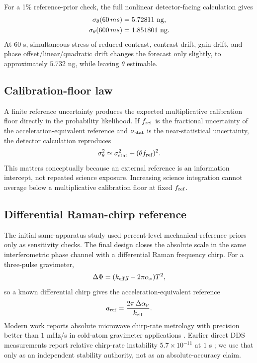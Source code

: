 For a 1\% reference-prior check, the full nonlinear detector-facing calculation gives
\begin{align}
\sigma_\theta(60\,{
m s})&=5.72811\ {\rm ng},\\
\sigma_\theta(600\,{
m s})&=1.851801\ {\rm ng}.
\label{eq:detector-forecast}
\end{align}
At $60$ s, simultaneous stress of reduced contrast, contrast drift, gain drift, and phase offset/linear/quadratic drift changes the forecast only slightly, to approximately $5.732$ ng, while leaving $\theta$ estimable.

\subsection{Calibration-floor law}

A finite reference uncertainty produces the expected multiplicative calibration floor directly in the probability likelihood. If $f_{\rm ref}$ is the fractional uncertainty of the acceleration-equivalent reference and $\sigma_{\rm stat}$ is the near-statistical uncertainty, the detector calculation reproduces
\begin{equation}
\sigma_\theta^2\simeq\sigma_{\rm stat}^2+(\theta f_{\rm ref})^2.
\label{eq:floorlaw}
\end{equation}
This matters conceptually because an external reference is an information intercept, not repeated science exposure. Increasing science integration cannot average below a multiplicative calibration floor at fixed $f_{\rm ref}$.

\subsection{Differential Raman-chirp reference}

The initial same-apparatus study used percent-level mechanical-reference priors only as sensitivity checks. The final design closes the absolute scale in the same interferometric phase channel with a differential Raman frequency chirp. For a three-pulse gravimeter,
\begin{equation}
\Delta\Phi=(k_{\rm eff}g-2\pi\alpha_\nu)T^2,
\label{eq:chirp-phase}
\end{equation}
so a known differential chirp gives the acceleration-equivalent reference
\begin{equation}
a_{\rm ref}=\frac{2\pi\,\Delta\alpha_\nu}{k_{\rm eff}}.
\label{eq:chirp-ref}
\end{equation}
Modern work reports absolute microwave chirp-rate metrology with precision better than $1$ mHz/s in cold-atom gravimeter applications \cite{Zhang2025}. Earlier direct DDS measurements report relative chirp-rate instability $5.7\times10^{-11}$ at $1$ s \cite{Tao2015}; we use that only as an independent stability authority, not as an absolute-accuracy claim.

